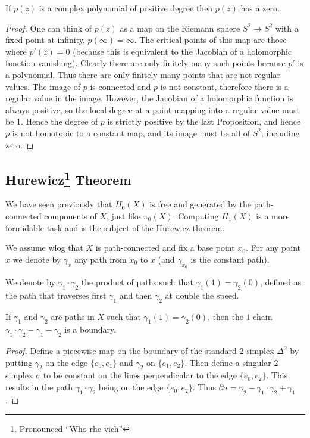 \documentclass[english,letterpaper]{article}%
\numberwithin{equation}{section}
\numberwithin{figure}{section}
\numberwithin{table}{section}
\theoremstyle{definition}
\theoremstyle{definition}
\theoremstyle{definition}
\theoremstyle{plain}
\theoremstyle{plain}
\theoremstyle{plain}
\theoremstyle{plain}
\theoremstyle{remark}
\theoremstyle{remark}
\begin{document}
\begin{cor}
    If $p(z)$ is a complex polynomial of positive degree then $p(z)$ has a zero.
\end{cor}
\begin{proof}
     One can think of $p(z)$ as a map on the Riemann sphere $S^2\to S^2$ with a fixed point at infinity, $p(\infty)=\infty$. The critical points of this map are those where $p'(z)=0$ (because this is equivalent to the Jacobian of a holomorphic function vanishing). Clearly there are only finitely many such points because $p'$ is a polynomial. Thus there are only finitely many points that are not regular values. The image of $p$ is connected and $p$ is not constant, therefore there is a regular value in the image. However, the Jacobian of a holomorphic function is always positive, so the local degree at a point mapping into a regular value must be 1. Hence the degree of $p$ is strictly positive by the last Proposition, and hence $p$ is not homotopic to a constant map, and its image must be all of $S^2$, including zero.
\end{proof}



\subsection{Hurewicz\footnote{Pronounced ``Who-rhe-vich''} Theorem}

We have seen previously that $H_0(X)$ is free and generated by the path-connected components of $X$, just like $\pi_0(X)$. Computing $H_1(X)$ is a more formidable task and is the subject of the Hurewicz theorem.

We assume \gls{wlog} that $X$ is path-connected and fix a base point $x_0$. For any point $x$ we denote by $\gamma_x$ any path from $x_0$ to $x$ (and $\gamma_{x_0}$ is the constant path).

We denote by $\gamma_1\cdot \gamma_2$ the product of paths such that $\gamma_1(1)=\gamma_2(0)$, defined as the path that traverses first $\gamma_1$ and then $\gamma_2$ at double the speed.

\begin{lem}
    If $\gamma_1$ and $\gamma_2$ are paths in $X$ such that $\gamma_1(1)=\gamma_2(0)$, then the 1-chain $\gamma_1\cdot\gamma_2-\gamma_1-\gamma_2$ is a boundary.
\end{lem}
\begin{proof}
     Define a piecewise map on the boundary of the standard 2-simplex $\Delta^2$ by putting $\gamma_2$ on the edge $\{e_0,e_1\}$ and $\gamma_2$ on $\{e_1,e_2\}$. Then define a singular 2-simplex $\sigma$ to be constant on the lines perpendicular to the edge $\{e_0,e_2\}$. This results in the path $\gamma_1\cdot\gamma_2$ being on the edge $\{e_0,e_2\}$. Thus $\partial\sigma=\gamma_2-\gamma_1\cdot\gamma_2+\gamma_1$.
\end{proof}
\end{document}
